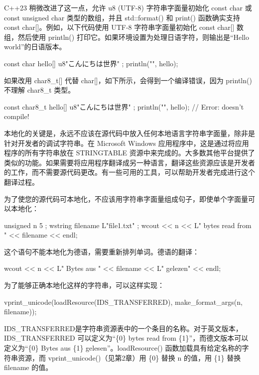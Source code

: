 
C++23 稍微改进了这一点，允许 u8 (UTF-8) 字符串字面量初始化 const char 或 const unsigned char 类型的数组，并且 std::format() 和 print() 函数确实支持 const char[]。例如，以下代码使用 UTF-8 字符串字面量初始化 const char[] 数组，然后使用 println() 打印它。如果环境设置为处理日语字符，则输出是“Hello world”的日语版本。

\begin{cpp}
const char hello[] { u8"こんにちは世界" };
println("{}", hello);
\end{cpp}

如果改用 char8\_t[] 代替 char[]，如下所示，会得到一个编译错误，因为 println() 不理解 char8\_t 类型。

\begin{cpp}
const char8_t hello[] { u8"こんにちは世界" };
println("{}", hello); // Error: doesn't compile!
\end{cpp}


本地化的关键是，永远不应该在源代码中放入任何本地语言字符串字面量，除非是针对开发者的调试字符串。在 Microsoft Windows 应用程序中，这是通过将应用程序的所有字符串放在 STRINGTABLE 资源中来完成的。大多数其他平台提供了类似的功能。如果需要将应用程序翻译成另一种语言，翻译这些资源应该是开发者的工作，而不需要源代码更改。有一些可用的工具，可以帮助开发者完成进行这个翻译过程。

为了使您的源代码可本地化，不应该用字符串字面量组成句子，即使单个字面量可以本地化：

\begin{cpp}
unsigned n { 5 };
wstring filename { L"file1.txt" };
wcout << n << L" bytes read from " << filename << endl;
\end{cpp}

这个语句不能本地化为德语，需要重新排列单词。德语的翻译：

\begin{cpp}
wcout << n << L" Bytes aus " << filename << L" gelezen" << endl;
\end{cpp}

为了能够正确本地化这样的字符串，可以这样实现：

\begin{cpp}
vprint_unicode(loadResource(IDS_TRANSFERRED), make_format_args(n, filename));
\end{cpp}

IDS\_TRANSFERRED是字符串资源表中的一个条目的名称。对于英文版本，IDS\_TRANSFERRED 可以定义为“\{0\} bytes read from \{1\}”，而德文版本可以定义为“\{0\} Bytes aus \{1\} gelesen”。loadResource() 函数加载具有给定名称的字符串资源，而 vprint\_unicode()（见第2章）用 \{0\} 替换 n 的值，用 \{1\} 替换 filename 的值。

